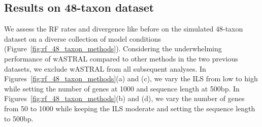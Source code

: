 \documentclass[10pt,a4paper]{article}
\newcommand{\add}[1]{{\color{blue} #1}}
\begin{document}



\subsection{Results on 48-taxon dataset}
We assess the RF rates and divergence like before on the simulated 48-taxon dataset on a diverse collection of model conditions (Figure~\ref{fig:rf_48_taxon_methods}). Considering the underwhelming performance of wASTRAL compared to other methods in the two previous datasets, we exclude wASTRAL from all subsequent analyses. In Figures~\ref{fig:rf_48_taxon_methods}(a) and (c), we vary the ILS from low to high while setting the number of genes at 1000 and sequence length at 500bp. In Figures~\ref{fig:rf_48_taxon_methods}(b) and (d), we vary the number of genes from 50 to 1000 while keeping the ILS moderate and setting the sequence length to 500bp. \add{{}}
\end{document}
